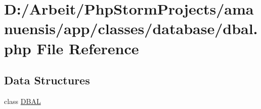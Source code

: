 \hypertarget{dbal_8php}{}\section{D\+:/\+Arbeit/\+Php\+Storm\+Projects/amanuensis/app/classes/database/dbal.php File Reference}
\label{dbal_8php}
\subsection*{Data Structures}
\begin{DoxyCompactItemize}
\item 
class \hyperlink{class_d_b_a_l}{D\+B\+A\+L}
\end{DoxyCompactItemize}

